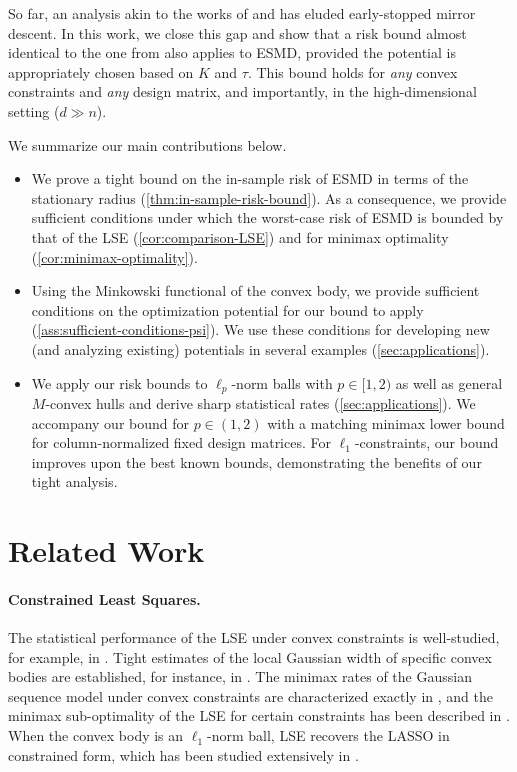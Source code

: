 \documentclass[a4paper]{article}
\theoremstyle{thmstyle}
\theoremstyle{defstyle}
\theoremstyle{remark}
\begin{document}
So far, an analysis akin to the works of \citet{Chatterjee2014} and \citet{Bellec2016sharporacleinequalitiessquares} has eluded early-stopped mirror descent. In this work, we close this gap and show that a risk bound almost identical to the one from \cite{Bellec2016sharporacleinequalitiessquares} also applies to ESMD, provided the potential is appropriately chosen based on $K$ and $\tau$. This bound holds for \emph{any} convex constraints and \emph{any} design matrix, and importantly, in the high-dimensional setting ($d\gg n$).


We summarize our main contributions below.
\begin{itemize}[leftmargin=*,itemsep=2pt,topsep=2pt]
    \item We prove a tight bound on the in-sample risk of ESMD in terms of the stationary radius (\cref{thm:in-sample-risk-bound}). As a consequence, we provide sufficient conditions under which the worst-case risk of ESMD is bounded by that of the LSE (\cref{cor:comparison-LSE}) and for minimax optimality (\cref{cor:minimax-optimality}). 
    \item Using the Minkowski functional of the convex body, we provide sufficient conditions on the optimization potential for our bound to apply (\cref{ass:sufficient-conditions-psi}). We use these conditions for developing new (and analyzing existing) potentials in several examples (\cref{sec:applications}). 
    \item We apply our risk bounds to $\ell_p$-norm balls with $p\in [1,2)$ as well as general $M$-convex hulls and derive sharp statistical rates (\cref{sec:applications}). We accompany our bound for $p\in(1,2)$ with a matching minimax lower bound for column-normalized fixed design matrices. For $\ell_1$-constraints, our bound improves upon the best known bounds, demonstrating the benefits of our tight analysis.
\end{itemize}




\section{Related Work}
\label{sec:related-work}

\paragraph{Constrained Least Squares.} The statistical performance of the LSE under convex constraints is well-studied, for example, in \cite{Birge1993rates,Vershynin2015estimation,Bellec2016sharporacleinequalitiessquares,Plan2017high,kur2023variance}. 
Tight estimates of the local Gaussian width of specific convex bodies are established, for instance, in
\citet{Gordon2007,Bellec2017localizedgaussianwidthmconvex}.
The minimax rates of the Gaussian sequence model under convex constraints are characterized exactly in \cite{Neykov2022minimax}, and the minimax sub-optimality of the LSE for certain constraints has been described in \cite{Prasadan2024some}. 
When the convex body is an $\ell_1$-norm ball, LSE recovers the LASSO \citep{Tibshirani1996lasso} in constrained form, which has been studied extensively in \citet{Candes2005,Bunea2007,Ye2010rate,Buhlmann2011, Pathak2024design}. 
\end{document}
